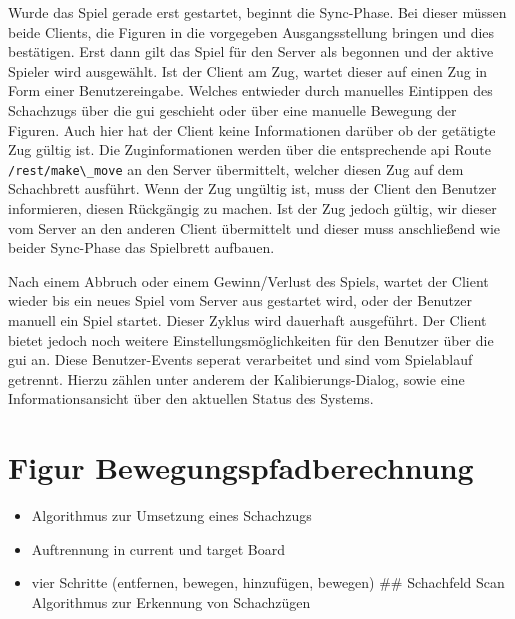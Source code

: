 Wurde das Spiel gerade erst gestartet, beginnt die Sync-Phase. Bei
dieser müssen beide Clients, die Figuren in die vorgegeben
Ausgangsstellung bringen und dies bestätigen. Erst dann gilt das Spiel
für den Server als begonnen und der aktive Spieler wird ausgewählt. Ist
der Client am Zug, wartet dieser auf einen Zug in Form einer
Benutzereingabe. Welches entwieder durch manuelles Eintippen des
Schachzugs über die \gls{gui} geschieht oder über eine manuelle Bewegung
der Figuren. Auch hier hat der Client keine Informationen darüber ob der
getätigte Zug gültig ist. Die Zuginformationen werden über die
entsprechende \gls{api} Route \passthrough{\lstinline!/rest/make\_move!}
an den Server übermittelt, welcher diesen Zug auf dem Schachbrett
ausführt. Wenn der Zug ungültig ist, muss der Client den Benutzer
informieren, diesen Rückgängig zu machen. Ist der Zug jedoch gültig, wir
dieser vom Server an den anderen Client übermittelt und dieser muss
anschließend wie beider Sync-Phase das Spielbrett aufbauen.

Nach einem Abbruch oder einem Gewinn/Verlust des Spiels, wartet der
Client wieder bis ein neues Spiel vom Server aus gestartet wird, oder
der Benutzer manuell ein Spiel startet. Dieser Zyklus wird dauerhaft
ausgeführt. Der Client bietet jedoch noch weitere
Einstellungsmöglichkeiten für den Benutzer über die \gls{gui} an. Diese
Benutzer-Events seperat verarbeitet und sind vom Spielablauf getrennt.
Hierzu zählen unter anderem der Kalibierungs-Dialog, sowie eine
Informationsansicht über den aktuellen Status des Systems.

\hypertarget{figur-bewegungspfadberechnung}{%
\section{Figur
Bewegungspfadberechnung}\label{figur-bewegungspfadberechnung}}

\begin{itemize}
\tightlist
\item
  Algorithmus zur Umsetzung eines Schachzugs
\item
  Auftrennung in current und target Board
\item
  vier Schritte (entfernen, bewegen, hinzufügen, bewegen) \#\#
  Schachfeld Scan Algorithmus zur Erkennung von Schachzügen
\end{itemize}

